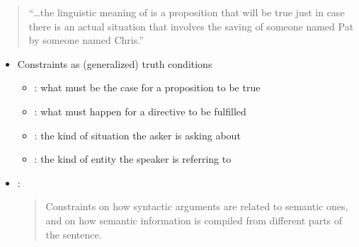\documentclass[a4paper,landscape,headrule,footrule]{foils}
\begin{document}
\noindent{} 
\begin{quote}
  “\ldots the linguistic meaning of  is a proposition
  that will be true just in case there is an actual situation that
  involves the saving of someone named Pat by someone named Chris.”
  \begin{flushright}
    \citep[p.~140]{sag:wasow:bender:2003}
  \end{flushright}
\end{quote}

\begin{itemize}
\item Constraints as (generalized) truth conditions
  \begin{itemize}
\item {}: what must be the case for a proposition to be true
\item {}: what must happen for a directive to be fulfilled
\item {}: the kind of situation the asker is asking about
\item {}: the kind of entity the speaker is referring to
\end{itemize}
\item {}: 
  \begin{quote}
    Constraints on how syntactic arguments are related to semantic
    ones, and on how semantic information is compiled from different
    parts of the sentence.
  \end{quote}
\end{itemize}

\end{document}
